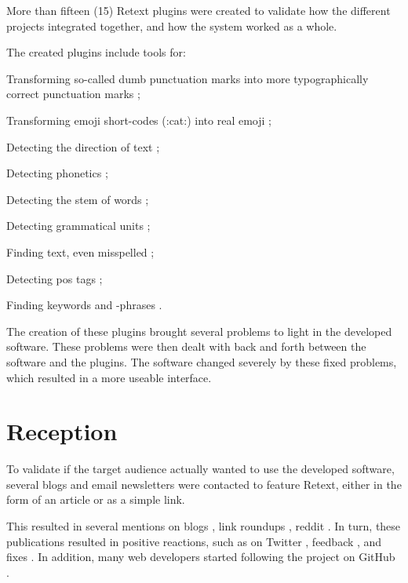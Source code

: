 \begin{enumerate}
More than fifteen (15) Retext plugins were created to validate how the
different projects integrated together, and how the system worked as a
whole.

The created plugins include tools for:

\begin{aenumerate}
\item
  Transforming so-called dumb punctuation marks into more
  typographically correct punctuation marks
  \autocite*{wooorm/retext-smartypants-source-code};
\item
  Transforming emoji short-codes (:cat:) into real emoji
  \autocite*{wooorm/retext-emoji-source-code};
\item
  Detecting the direction of text
  \autocite*{wooorm/retext-directionality-source-code};
\item
  Detecting phonetics
  \autocite*{wooorm/retext-double-metaphone-source-code};
\item
  Detecting the stem of words
  \autocite*{wooorm/retext-porter-stemmer-source-code};
\item
  Detecting grammatical units
  \autocite*{wooorm/retext-visit-source-code};
\item
  Finding text, even misspelled
  \autocite*{wooorm/retext-search-source-code};
\item
  Detecting \gls{pos} tags
  \autocite*{wooorm/retext-pos-source-code};
\item
  Finding keywords and -phrases
  \autocite*{wooorm/retext-keywords-source-code}.
\end{aenumerate}

The creation of these plugins brought several problems to light in the
developed software. These problems were then dealt with back and forth
between the software and the plugins. The software changed severely by
these fixed problems, which resulted in a more useable interface.

\section{Reception}\label{reception}

To validate if the target audience actually wanted to use the developed
software, several blogs and email newsletters were contacted to feature
Retext, either in the form of an article or as a simple link.

This resulted in several mentions on blogs
\autocite{dailyjs.com-natural-language-parsing-retext}, link roundups
\autocites[e.g., ][]{github.com-awesome-machine-learning}
{github.com-awesome-nodejs}, reddit  \autocites[e.g., ][]
{reddit.com-mention-1}{reddit.com-mention-2}{reddit.com-mention-3}. In turn,
these publications resulted in positive reactions, such as on Twitter
\autocites{twitter.com-mention-1}{twitter.com-mention-2}
{twitter.com-mention-3}{twitter.com-mention-4}{twitter.com-mention-5},
feedback \autocites{github.com-issue-1}{github.com-issue-2}, and fixes
\autocite{github.com-pull-request}. In addition, many web developers started
following the project on GitHub \autocite{github.com-stargazers}.


\end{enumerate}
